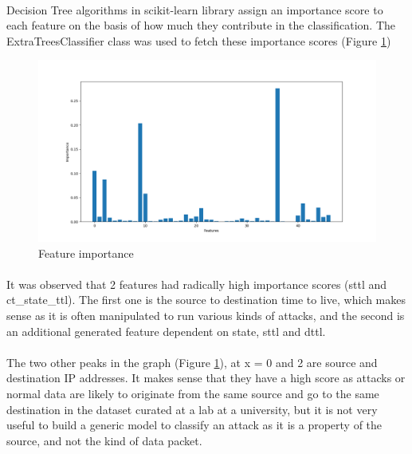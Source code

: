 \paragraph{}
Decision Tree algorithms in scikit-learn library assign an importance score to each feature on the basis of how much they contribute in the classification. The ExtraTreesClassifier class was used to fetch these importance scores (Figure \ref{feature_importance})
\begin{figure}[h]
    \hfill\includegraphics[width=1\textwidth]{Chapter3/feature_importance}\hspace*{\fill}
    \caption{Feature importance}
    \label{feature_importance}
\end{figure}

\paragraph{}
It was observed that 2 features had radically high importance scores (sttl and ct\_state\_ttl). The first one is the source to destination time to live, which makes sense as it is often manipulated to run various kinds of attacks, and the second is an additional generated feature dependent on state, sttl and dttl.

\paragraph{}
The two other peaks in the graph (Figure \ref{feature_importance}), at x = 0 and 2 are source and destination IP addresses. It makes sense that they have a high score as attacks or normal data are likely to originate from the same source and go to the same destination in the dataset curated at a lab at a university, but it is not very useful to build a generic model to classify an attack as it is a property of the source, and not the kind of data packet.

